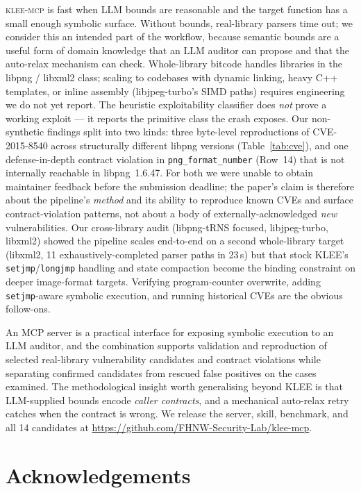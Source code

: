 \documentclass[3p,times,procedia]{elsarticle}
\begin{document}
\textsc{klee-mcp} is fast when LLM bounds are reasonable and the target function has a small enough symbolic surface. Without bounds, real-library parsers time out; we consider this an intended part of the workflow, because semantic bounds are a useful form of domain knowledge that an LLM auditor can propose and that the auto-relax mechanism can check. Whole-library bitcode handles libraries in the libpng / libxml2 class; scaling to codebases with dynamic linking, heavy C++ templates, or inline assembly (libjpeg-turbo's SIMD paths) requires engineering we do not yet report. The heuristic exploitability classifier does \emph{not} prove a working exploit --- it reports the primitive class the crash exposes. Our non-synthetic findings split into two kinds: three byte-level reproductions of CVE-2015-8540 across structurally different libpng versions (Table~\ref{tab:cve}), and one defense-in-depth contract violation in \texttt{png\_format\_number} (Row~14) that is not internally reachable in libpng~1.6.47. For both we were unable to obtain maintainer feedback before the submission deadline; the paper's claim is therefore about the pipeline's \emph{method} and its ability to reproduce known CVEs and surface contract-violation patterns, not about a body of externally-acknowledged \emph{new} vulnerabilities. Our cross-library audit (libpng-tRNS focused, libjpeg-turbo, libxml2) showed the pipeline scales end-to-end on a second whole-library target (libxml2, 11 exhaustively-completed parser paths in 23\,s) but that stock KLEE's \texttt{setjmp}/\texttt{longjmp} handling and state compaction become the binding constraint on deeper image-format targets. Verifying program-counter overwrite, adding \texttt{setjmp}-aware symbolic execution, and running historical CVEs are the obvious follow-ons.

An MCP server is a practical interface for exposing symbolic execution to an LLM auditor, and the combination supports validation and reproduction of selected real-library vulnerability candidates and contract violations while separating confirmed candidates from rescued false positives on the cases examined. The methodological insight worth generalising beyond KLEE is that LLM-supplied bounds encode \emph{caller contracts}, and a mechanical auto-relax retry catches when the contract is wrong. We release the server, skill, benchmark, and all 14 candidates at \url{https://github.com/FHNW-Security-Lab/klee-mcp}.

\section*{Acknowledgements}
\end{document}

